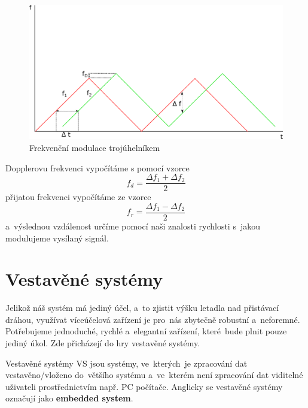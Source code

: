 \begin{itemize}
					\begin{figure}[H]
						\begin{center}
							\includegraphics[scale=0.75]{obrazky-figures/fmcw.png}
					 		\caption{Frekvenční modulace trojúhelníkem}\label{FMCW-triangle}
					 	\end{center}
					\end{figure}
					 
					 Dopplerovu frekvenci vypočítáme s pomocí vzorce \[f_d=\frac{\Delta f_1 + \Delta f_2 }{2}\] přijatou frekvenci vypočítáme ze vzorce \[f_r=\frac{\Delta f_1-\Delta f_2}{2}\]
					 a~výslednou vzdálenost určíme pomocí naši znalosti rychlosti s~jakou modulujeme vysílaný signál.
					 
			\end{itemize}
		
		\section{Vestavěné systémy}
			Jelikož náš systém má jediný účel, a~to zjistit výšku letadla nad přistávací dráhou, využívat víceúčelová zařízení je pro~nás zbytečně robustní a~neforemné. Potřebujeme jednoduché, rychlé a~elegantní zařízení, které~bude plnit pouze jediný úkol. Zde přicházejí do hry vestavěné systémy.
			
			\begin{definice}
				Vestavěné systémy VS jsou systémy, ve~kterých~je zpracování dat vestavěno/vloženo do~většího systému a~ve~kterém není zpracování dat viditelné uživateli prostřednictvím např. PC počítače. Anglicky se vestavěné systémy označují jako \textbf{embedded system}\cite{impSkripta}.
			\end{definice}
			
